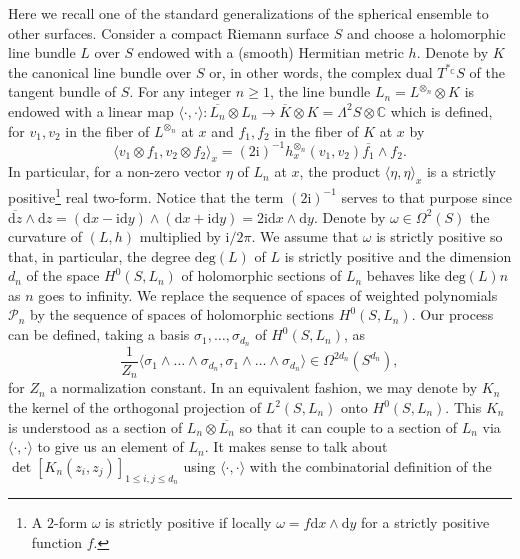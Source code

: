 \documentclass[10pt,reqno]{amsart}
\numberwithin{equation}{section}
\numberwithin{figure}{section}
\theoremstyle{plain}
\newcommand{\<}{\langle}
\renewcommand{\>}{\rangle}
\begin{document}
Here we recall one of the standard generalizations
of the spherical ensemble to other surfaces. Consider a 
compact Riemann
surface $S$ and choose
a holomorphic line bundle $L$ over $S$ endowed with
a (smooth) Hermitian metric $h$. 
Denote by $K$ the canonical line bundle over $S$ or,
in other words, the complex dual $T^{*_{\mathbb C}}S$
of the tangent bundle of $S$.
For any integer $n \geq 1$, the line bundle
$L_n = L^{\otimes_n} \otimes K$ is endowed with
a linear map
$\langle \cdot, \cdot \rangle:\overline{L_n} 
\otimes L_n \to  \overline K \otimes K
= \Lambda^2 S \otimes \mathbb C$
which is defined, for $v_1,v_2$ in the fiber of 
$L^{\otimes_n}$ at $x$
and $f_1,f_2$ in the fiber of $K$ at $x$ by
\[\langle v_1 \otimes f_1, v_2 \otimes f_2 \rangle_x 
= (2\mathrm{i})^{-1} h_x^{\otimes_n}(v_1,v_2) \overline{f_1} \wedge f_2.
\]
In particular,
for a non-zero vector $\eta$ of $L_n$ at $x$, the product
$\langle \eta,\eta \rangle_x $ is a strictly positive\footnote{A $2$-form
$\omega$
is strictly positive if locally
$\omega = f\mathrm{d}x \wedge\mathrm{d}y$ for a 
strictly positive function $f$.}
real two-form. Notice that the term $(2\mathrm{i})^{-1}$ 
serves to that purpose since
$\overline{\mathrm{d}z} \wedge \mathrm{d}z = (\mathrm{d}x - \mathrm{i} \mathrm{d}y) \wedge (\mathrm{d}x + \mathrm{i} \mathrm{d}y)
= 2\mathrm{i} \mathrm{d}x \wedge \mathrm{d}y$. 
Denote by $\omega \in \Omega^2(S)$ the curvature of 
$(L,h)$ multiplied by $\mathrm{i}/2\pi$. 
We assume that
$\omega$ is strictly positive so that, in particular,
the degree $\mathrm{deg}(L)$ of $L$ is strictly positive and
the dimension $d_n$ of the space $H^0(S,L_n)$ of holomorphic sections of $L_n$ behaves like $\mathrm{deg}(L)n$
as $n$ goes to infinity.
We replace the sequence of spaces 
of weighted polynomials $\mathcal P_n$
by the sequence of spaces of holomorphic sections $H^0(S,L_n)$. Our process can be defined, taking a basis
$\sigma_1,\dots,\sigma_{d_n}$ of $H^0(S,L_n)$,
as
\[
\frac{1}{Z_n}\langle \sigma_1\wedge \dots \wedge \sigma_{d_n},
\sigma_1\wedge \dots \wedge \sigma_{d_n} \rangle
\in \Omega^{2d_n}(S^{d_n}),\]
for $Z_n$ a normalization constant.
In an equivalent fashion, we may 
denote by $K_n$ the kernel of the orthogonal
projection of
$L^2(S,L_n)$ onto $H^0(S,L_n)$. 
This $K_n$ is understood as a section
of $L_n \otimes \overline{L_n}$
so that it can couple to a section 
of $L_n$ 
via $\langle \cdot, \cdot \rangle$
to give us an element of $L_n$.
It makes sense to 
talk about $\det{[K_n(z_i,z_j)]}_{1\leq i,j\leq d_n}$
using $\langle \cdot, \cdot \rangle$ with the combinatorial definition of the
\end{document}
